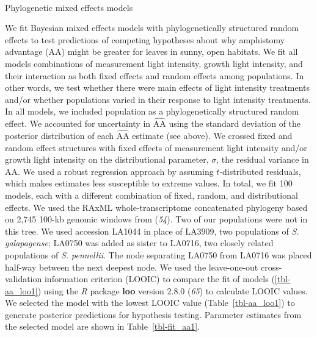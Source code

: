 \documentclass[
  letterpaper,
  DIV=11,
  numbers=noendperiod]{scrartcl}
\makeatletter
\let\oldparagraph\paragraph
\renewcommand{\paragraph}{
    \@ifstar
      \xxxParagraphStar
      \xxxParagraphNoStar
  }
\newcommand{\xxxParagraphStar}[1]{\oldparagraph*{#1}\mbox{}}
\newcommand{\xxxParagraphNoStar}[1]{\oldparagraph{#1}\mbox{}}
\newcommand{\aax}{$\mathrm{AA}$}
\makeatother
\begin{document}
\paragraph{Phylogenetic mixed effects models}\label{sec-phylo}

We fit Bayesian mixed effects models with phylogenetically structured
random effects to test predictions of competing hypotheses about why
amphistomy advantage (\aax) might be greater for leaves in sunny, open
habitats. We fit all models combinations of measurement light intensity,
growth light intensity, and their interaction as both fixed effects and
random effects among populations. In other words, we test whether there
were main effects of light intensity treatments and/or whether
populations varied in their response to light intensity treatments. In
all models, we included population as a phylogenetically structured
random effect. We accounted for uncertainty in \(\widehat{\mathrm{AA}}\)
using the standard deviation of the posterior distribution of each
\(\widehat{\mathrm{AA}}\) estimate (see above). We crossed fixed and
random effect structures with fixed effects of measurement light
intensity and/or growth light intensity on the distributional parameter,
\(\sigma\), the residual variance in \aax{}. We used a robust regression
approach by assuming \(t\)-distributed residuals, which makes estimates
less susceptible to extreme values. In total, we fit 100 models, each
with a different combination of fixed, random, and distributional
effects. We used the RAxML whole-transcriptome concatenated phylogeny
based on 2,745 100-kb genomic windows from (\emph{54}). Two of our
populations were not in this tree. We used accession LA1044 in place of
LA3909, two populations of \emph{S. galapagense}; LA0750 was added as
sister to LA0716, two closely related populations of \emph{S.
pennellii}. The node separating LA0750 from LA0716 was placed half-way
between the next deepest node. We used the leave-one-out
cross-validation information criterion (LOOIC) to compare the fit of
models (\autoref{tbl-aa_loo1}) using the \emph{R} package \textbf{loo}
version 2.8.0 (\emph{65}) to calculate LOOIC values. We selected the
model with the lowest LOOIC value (Table~\ref{tbl-aa_loo1}) to generate
posterior predictions for hypothesis testing. Parameter estimates from
the selected model are shown in Table~\ref{tbl-fit_aa1}.
\end{document}
